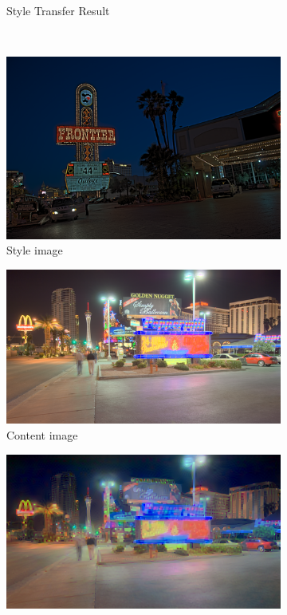 {\begin{landscape}
\begin{figure}
\begin{subfigure}[b]{0.53\textwidth}
    \caption{Style Transfer Result}
    \label{fig:neuro_style_result_1}
\end{subfigure}\hfill \\ 
\begin{subfigure}[b]{0.53\textwidth}
    \centering
    \includegraphics[width=\textwidth]{figures/neuro_style_transfer/Frontier.hdr_candy.png}
    \caption{Style image}
\end{subfigure}\hfill
\begin{subfigure}[b]{0.53\textwidth}
    \centering
    \includegraphics[width=\textwidth]{figures/neuro_style_transfer/Peppermill_reinhard02.png}
    \caption{Content image}
\end{subfigure}\hfill
\begin{subfigure}[b]{0.53\textwidth}
    \centering
    \includegraphics[width=\textwidth]{figures/neuro_style_transfer/Peppermill_0.1_10000.0_candy.png}

\end{subfigure}
\end{figure}
\end{landscape}}
